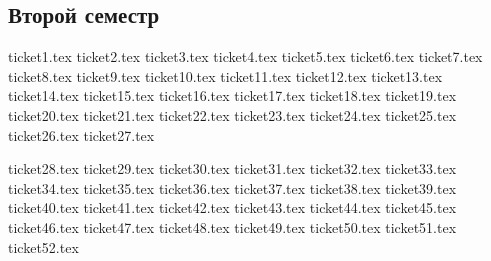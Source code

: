 \documentclass[12pt,letterpaper]{report}
\theoremstyle{definition}
\begin{document}
\newpage
\pagestyle{plain}
\fi
\tableofcontents
\newpage
\begin{normalsize}
\chapter*{Второй семестр}
{ticket1.tex}
{ticket2.tex}
{ticket3.tex}
{ticket4.tex}
{ticket5.tex}
{ticket6.tex}
{ticket7.tex}
{ticket8.tex}
{ticket9.tex}
{ticket10.tex}
{ticket11.tex}
{ticket12.tex}
{ticket13.tex}
{ticket14.tex}
{ticket15.tex}
{ticket16.tex}
{ticket17.tex}
{ticket18.tex}
{ticket19.tex}
{ticket20.tex}
{ticket21.tex}
{ticket22.tex}
{ticket23.tex}
{ticket24.tex}
{ticket25.tex}
{ticket26.tex}
{ticket27.tex}

{ticket28.tex}
{ticket29.tex}
{ticket30.tex}
{ticket31.tex}
{ticket32.tex}
{ticket33.tex}
{ticket34.tex}
{ticket35.tex}
{ticket36.tex}
{ticket37.tex}
{ticket38.tex}
{ticket39.tex}
{ticket40.tex}
{ticket41.tex}
{ticket42.tex}
{ticket43.tex}
{ticket44.tex}
{ticket45.tex}
{ticket46.tex}
{ticket47.tex}
{ticket48.tex}
{ticket49.tex}
{ticket50.tex}
{ticket51.tex}
{ticket52.tex}
\end{normalsize}
\end{document}
